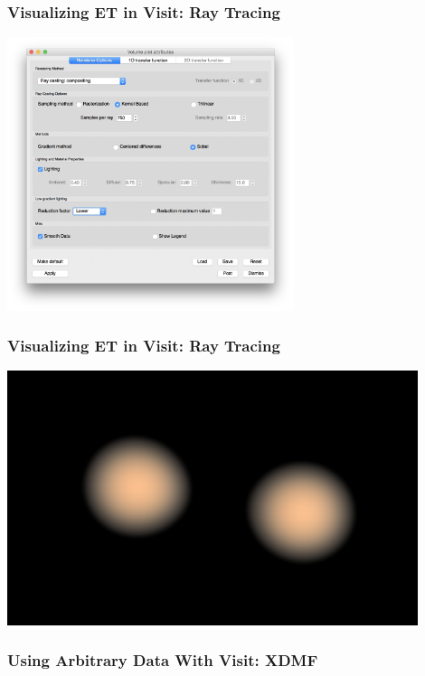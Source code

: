 \documentclass[]{beamer}
\begin{document}
\begin{frame}
  \frametitle{Visualizing ET in Visit: Ray Tracing}
  \begin{center}
    \includegraphics[height=8cm]{figures/visit/ray-trace-choice}
  \end{center}
\end{frame}

\begin{frame}
  \frametitle{Visualizing ET in Visit: Ray Tracing}
  \begin{center}
    \includegraphics[width=12cm]{figures/visit/stars-volume-render}
  \end{center}
\end{frame}

\begin{frame}
  \frametitle{Using Arbitrary Data With Visit: XDMF}
  
\end{frame}
\end{document}
